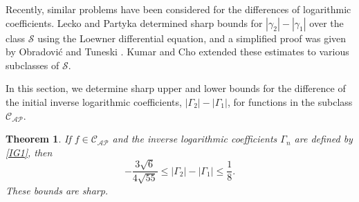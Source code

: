 \documentclass[10pt,a4paper]{amsart}
\newtheorem{theo}{Theorem}[section]
\numberwithin{equation}{section}
\begin{document}
Recently, similar problems have been considered for the differences of logarithmic coefficients. Lecko and Partyka \cite{Lecko2023} determined sharp bounds for $|\gamma_2| - |\gamma_1|$ over the class $\mathcal{S}$ using the Loewner differential equation, and a simplified proof was given by Obradovi\'{c} and Tuneski \cite{Obradovic2024}. Kumar and Cho \cite{Kumar2023} extended these estimates to various subclasses of $\mathcal{S}$.

In this section, we determine sharp upper and lower bounds for the difference of the initial inverse logarithmic coefficients, $|\Gamma_2| - |\Gamma_1|$, for functions in the subclass $\mathcal{C}_{\mathcal{AP}}$.

\begin{theo}\label{T2}
If $f \in \mathcal{C}_{\mathcal{AP}}$ and the inverse logarithmic coefficients $\Gamma_n$ are defined by \eqref{IG1}, then
\begin{equation}\label{po9}
-\frac{3\sqrt{6}}{4\sqrt{55}} \le |\Gamma_2|-|\Gamma_1| \le \frac{1}{8}.
\end{equation}
These bounds are sharp.
\end{theo}
\end{document}
